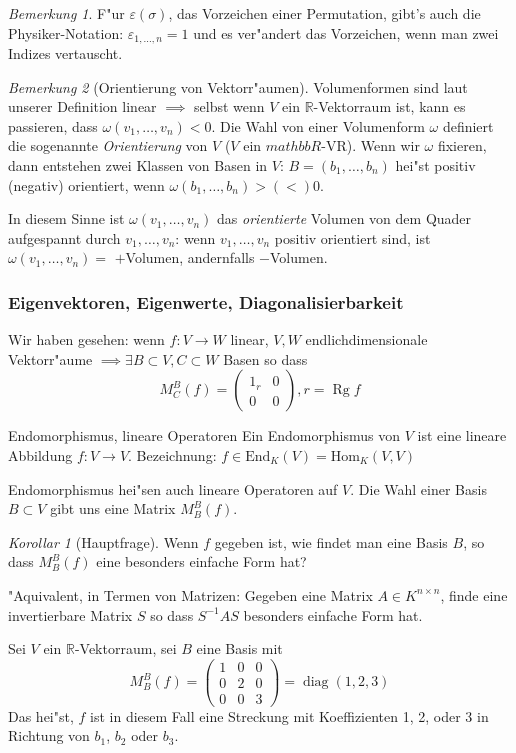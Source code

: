\documentclass[11pt]{article}
\DeclareMathOperator{\mRg}{Rg}
\DeclareMathOperator{\mDiag}{diag}
\theoremstyle{remark}
\theoremstyle{definition}
\theoremstyle{remark}
\newtheorem*{korollar}{Korollar}
\newtheorem*{bem}{Bemerkung}
\begin{document}
\begin{bem}
	F"ur \(\varepsilon(\sigma)\), das Vorzeichen einer Permutation, gibt's auch die Physiker-Notation: \(\varepsilon_{1,\dots,n}=1\) und es ver"andert das Vorzeichen, wenn man zwei Indizes vertauscht.
\end{bem}
\begin{bem}[Orientierung von Vektorr"aumen]
	Volumenformen sind laut unserer Definition linear \(\implies\) selbst wenn \(V\) ein \(\mathbb{R}\)-Vektorraum ist, kann es passieren, dass \(\omega(v_1,\dots,v_n)< 0\). Die Wahl von einer Volumenform \(\omega\) definiert die sogenannte \emph{Orientierung} von \(V\) (\(V\) ein \(mathbb{R}\)-VR). Wenn wir \(\omega\) fixieren, dann entstehen zwei Klassen von Basen in \(V\): \(B = (b_1,\dots,b_n)\) hei"st positiv (negativ) orientiert, wenn \(\omega(b_1,\dots,b_n) > (<) 0\). 
	
	In diesem Sinne ist \(\omega(v_1,\dots,v_n)\) das \emph{orientierte} Volumen von dem Quader aufgespannt durch \(v_1,\dots,v_n\): wenn \(v_1,\dots,v_n\) positiv orientiert sind, ist \(\omega(v_1,\dots,v_n) = \) \(+\)Volumen, andernfalls \(-\)Volumen.
\end{bem}

\subsubsection{Eigenvektoren, Eigenwerte, Diagonalisierbarkeit}

Wir haben gesehen: wenn \(f: V\to W\) linear, \(V, W\) endlichdimensionale Vektorr"aume \(\implies \exists B\subset V, C\subset W \) Basen so dass
\[M^B_C(f) = \begin{pmatrix}
1_r & 0\\
0 & 0
\end{pmatrix}, r = \mRg f\]

\begin{definition}{Endomorphismus, lineare Operatoren}{}
	Ein Endomorphismus von \(V\) ist eine lineare Abbildung \(f: V\to V\). Bezeichnung: \(f\in \text{End}_K(V) = \text{Hom}_K(V,V) \)	
	
	Endomorphismus hei"sen auch lineare Operatoren auf \(V\). Die Wahl einer Basis \(B\subset V \) gibt uns eine Matrix \(M^B_B(f)\).
\end{definition}
\begin{korollar}[Hauptfrage]
	Wenn \(f\) gegeben ist, wie findet man eine Basis \(B\), so dass \(M^B_B(f)\) eine besonders einfache Form hat?
	
	"Aquivalent, in Termen von Matrizen: Gegeben eine Matrix \(A\in K^{n\times n} \), finde eine invertierbare Matrix \(S\) so dass \(S^{-1}AS\) besonders einfache Form hat.
\end{korollar}
  Sei \(V\) ein \(\mathbb{R}\)-Vektorraum, sei \(B\) eine Basis mit \[M^B_B(f) =
    \begin{pmatrix}
      1 & 0 & 0 \\
      0 & 2 & 0 \\
      0 & 0 & 3
    \end{pmatrix} = \mDiag(1,2,3) \]
  Das hei"st, \(f\) ist in diesem Fall eine Streckung mit Koeffizienten 1, 2, oder 3 in Richtung von \(b_1\), \(b_2\) oder \(b_{3}\).
\end{document}

